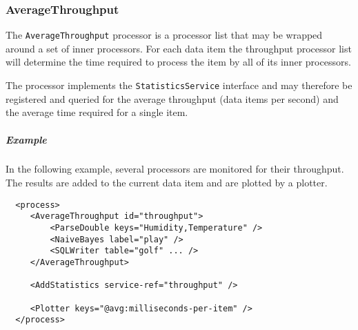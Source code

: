 \subsubsection{AverageThroughput}

The \texttt{AverageThroughput} processor is a processor list that may be
wrapped around a set of inner processors. For each data item the
throughput processor list will determine the time required to process
the item by all of its inner processors.

The processor implements the \texttt{StatisticsService} interface and
may therefore be registered and queried for the average throughput (data
items per second) and the average time required for a single item.

\subparagraph{Example}

In the following example, several processors are monitored for their
throughput. The results are added to the current data item and are
plotted by a plotter.

\begin{verbatim}
  <process>
     <AverageThroughput id="throughput">
         <ParseDouble keys="Humidity,Temperature" />
         <NaiveBayes label="play" />
         <SQLWriter table="golf" ... />
     </AverageThroughput>

     <AddStatistics service-ref="throughput" />

     <Plotter keys="@avg:milliseconds-per-item" />
  </process>
\end{verbatim}


